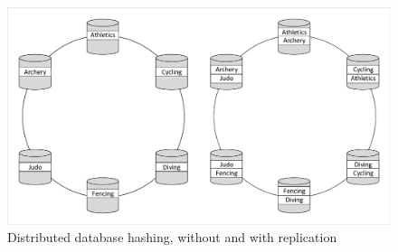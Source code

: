 \begin{figure}
\caption{Distributed database hashing, without and with replication}
\label{figure:consistent_hashing}
\centering
\includegraphics[trim = 5 5 5 5, clip, width=\textwidth]{img/dbdist}
\end{figure}
